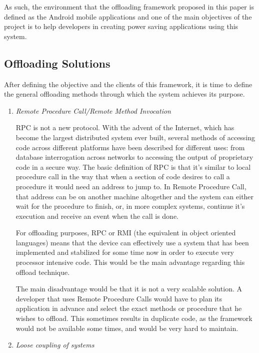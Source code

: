 As such, the environment that the offloading framework proposed in this paper is defined as the Android mobile applications and one of the main objectives of the project is to help developers in creating power saving applications using this system.

\subsection{Offloading Solutions}
\label{offloadingsolutions}

After defining the objective and the clients of this framework, it is time to define the general offloading methods through which the system achieves its purpose.

\begin{enumerate}

\item{\emph{Remote Procedure Call/Remote Method Invocation}}

RPC\cite{RPC} is not a new protocol. With the advent of the Internet, which has become the largest distributed system ever built, several methods of accessing code across different platforms have been described for different uses: from database interrogation across networks to accessing the output of proprietary code in a secure way. The basic definition of RPC is that it's similar to local procedure call in the way that when a section of code desires to call a procedure it would need an address to jump to. In Remote Procedure Call, that address can be on another machine altogether and the system can either wait for the procedure to finish, or, in more complex systems, continue it's execution and receive an event when the call is done. 

For offloading purposes, RPC or RMI (the equivalent in object oriented languages) means that the device can effectively use a system that has been implemented and stabilized for some time now in order to execute very processor intensive code. This would be the main advantage regarding this offload technique.

The main disadvantage would be that it is not a very scalable solution. A developer that uses Remote Procedure Calls would have to plan its application in advance and select the exact methods or procedure that he wishes to offload. This sometimes results in duplicate code, as the framework would not be available some times, and would be very hard to maintain.

\item{\emph{Loose coupling of systems}}


\end{enumerate}

